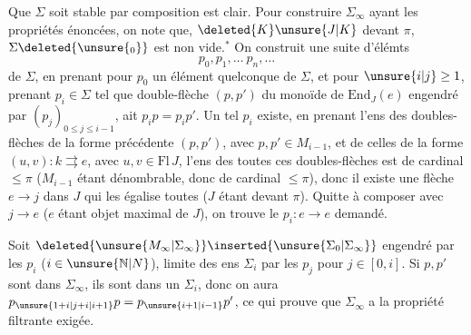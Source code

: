 \uline{} Que $\Sigma$ soit stable par composition est clair. Pour construire $\Sigma_{\infty}$ ayant les propriétés énoncées, on note que, $\deleted{K}\unsure{J|K}$   devant $\pi$,  $\Sigma\deleted{\unsure{_0}}$ est non vide.$^*$
 On construit  une suite d'élémts
\[
p_0,p_1,\ldots\ p_n,\ldots
\]
de $\Sigma$, en prenant pour $p_0$ un élément quelconque de $\Sigma$, et pour $\unsure{i|j}\geq1$, prenant $p_i\in\Sigma$ tel que    double-flèche \deleted{\unsure{$(\alpha,\beta)$}} $(p,p')$ du monoïde  de $\mathrm{End}_J(e)$ engendré par $(p_j)_{0\leq j\leq i-1}$,  ait $p_i p=p_i p'$. Un tel $p_i$ existe,  en prenant l'ens des doubles-flèches de la forme précédente $(p,p')$, avec $p,p'\in M_{i-1}$, et de celles de la forme $(u,v):k\rightrightarrows e$, avec $u,v\in\mathrm{Fl}\,J$, l'ens des
toutes ces doubles-flèches est de cardinal $\leq\pi$ ($M_{i-1}$ étant dénombrable, donc de cardinal $\leq\pi$), donc il existe une flèche $e\longrightarrow j$ dans $J$ qui les égalise toutes ($J$ étant  devant $\pi$). Quitte à composer avec $j\longrightarrow e$ ($e$ étant objet maximal de $J$), on trouve le $p_i:e\longrightarrow e$ demandé.

Soit  $\deleted{\unsure{M_{\infty}|\Sigma_{\infty}}}\inserted{\unsure{\Sigma_0|\Sigma_{\infty}}}$    engendré par les $p_i$ ($i\in\unsure{\mathbb{N}|N}$),  limite  des ens  $\Sigma_i$  par les $p_j$ pour $j\in[0,i]$. Si $p,p'$ sont dans $\Sigma_\infty$, ils sont dans un \inserted{$=$} $\Sigma_i$, donc on aura $p_{\unsure{1+i|j+i|i+1}}p=p_{\unsure{i+1|i-1}}p'$, ce qui prouve que $\Sigma_\infty$ a la propriété filtrante exigée.

